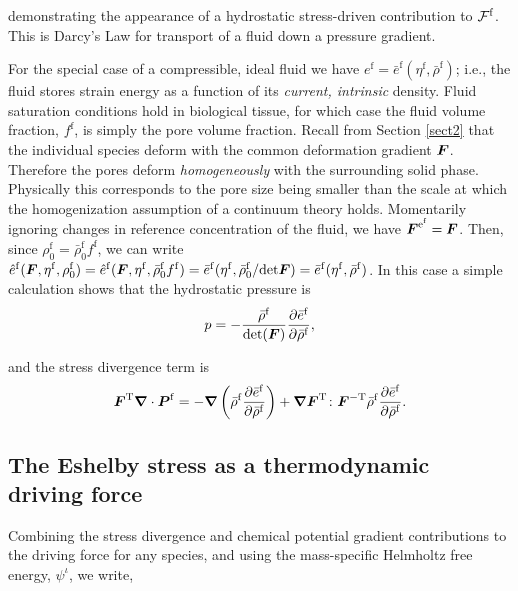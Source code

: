 \noindent demonstrating the appearance of a hydrostatic
stress-driven contribution to ${\boldmath{{\mathcal F}}}^\mathrm{f}$. This
is Darcy's Law for transport of a fluid down a pressure gradient.

For the special case of a compressible, ideal fluid we have
$e^\mathrm{f} =
\bar{e}^\mathrm{f}(\eta^\mathrm{f},\bar{\rho}^\mathrm{f})$; i.e.,
the fluid stores strain energy as a function of its \emph{current,
intrinsic} density. Fluid saturation conditions hold in biological
tissue, for which case the fluid volume fraction, $f^\mathrm{f}$,
is simply the pore volume fraction. Recall from Section
\ref{sect2} that the individual species deform with the common
deformation gradient $\mbox{\boldmath$ F$}$. Therefore the pores deform
\emph{homogeneously} with the surrounding solid phase. Physically
this corresponds to the pore size being smaller than the scale at
which the homogenization assumption of a continuum theory holds.
Momentarily ignoring changes in reference concentration of the
fluid, we have $\mbox{\boldmath$ F$}^{\mathrm{e}^\mathrm{f}} = \mbox{\boldmath$ F$}$.  Then, since
$\rho^\mathrm{f}_0 = \bar{\rho}^\mathrm{f}_0 f^\mathrm{f}$, we can
write $\hat{e}^\mathrm{f}(\mbox{\boldmath$ F$},\eta^\mathrm{f},\rho^\mathrm{f}_0) =
\hat{e}^\mathrm{f}(\mbox{\boldmath$ F$},\eta^\mathrm{f},\bar{\rho}^\mathrm{f}_0
f^\mathrm{f}) =
\bar{e}^\mathrm{f}(\eta^\mathrm{f},\bar{\rho}^\mathrm{f}_0/\mathrm{det}\mbox{\boldmath$ F$})=
\bar{e}^\mathrm{f}(\eta^\mathrm{f},\bar{\rho}^\mathrm{f})$. In
this case a simple calculation shows that the hydrostatic pressure
is
\begin{displaymath}
p =
-\frac{\bar{\rho}^\mathrm{f}}{\mathrm{det}(\mbox{\boldmath$ F$})}\frac{\partial\bar{e}^\mathrm{f}}{\partial\bar{\rho}^\mathrm{f}},
\end{displaymath}

\noindent and the stress divergence term is
\begin{displaymath}
\mbox{\boldmath$ F$}^\mathrm{T}\mbox{\boldmath$\nabla$}\cdot\mbox{\boldmath$ P$}^\mathrm{f} =
-\mbox{\boldmath$\nabla$}\left(\bar{\rho}^\mathrm{f}\frac{\partial\bar{e}^\mathrm{f}}{\partial\bar{\rho}^\mathrm{f}}\right)
+
\mbox{\boldmath$\nabla$}\mbox{\boldmath$ F$}^\mathrm{T}\colon\mbox{\boldmath$ F$}^{-\mathrm{T}}\bar{\rho}^\mathrm{f}\frac{\partial\bar{e}^\mathrm{f}}{\partial\bar{\rho}^\mathrm{f}}.
\end{displaymath}

\subsection{The Eshelby stress as a thermodynamic driving
force}\label{sect5.3}

Combining the stress divergence and chemical potential gradient
contributions to the driving force for any species, and using the
mass-specific Helmholtz free energy, $\psi^\iota$, we write,

